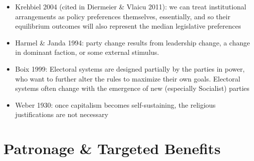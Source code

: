 \documentclass[12pt]{article}
\begin{document}
\begin{itemize}
\begin{itemize}
    \end{itemize}
    \item Krehbiel 2004 (cited in Diermeier \& Vlaicu 2011): we can treat institutional arrangements as policy preferences themselves, essentially, and so their equilibrium outcomes will also represent the median legislative preferences
    \item Harmel \& Janda 1994: party change results from leadership change, a change in dominant faction, or some external stimulus.
    \item Boix 1999: Electoral systems are designed partially by the parties in power, who want to further alter the rules to maximize their own goals. Electoral systems often change with the emergence of new (especially Socialist) parties
    \item Weber 1930: once capitalism becomes self-sustaining, the religious justifications are not necessary
\end{itemize}





\section*{Patronage \& Targeted Benefits}
\end{document}
